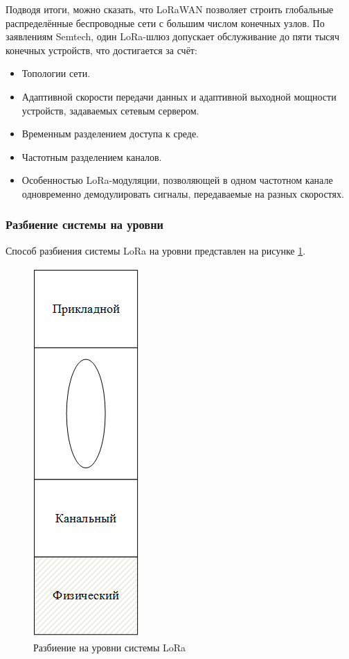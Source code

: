 Подводя итоги, можно сказать, что LoRaWAN позволяет строить глобальные распределённые беспроводные сети с большим числом конечных узлов. По заявлениям Semtech, один LoRa-шлюз допускает обслуживание до пяти тысяч конечных устройств, что достигается за счёт:
\begin{itemize}	
\item Топологии сети.
\item Адаптивной скорости передачи данных и адаптивной выходной мощности устройств, задаваемых сетевым сервером.
\item Временным разделением доступа к среде.
\item Частотным разделением каналов.
\item Особенностью LoRa-модуляции, позволяющей в одном частотном канале одновременно демодулировать сигналы, передаваемые на разных скоростях.
\end{itemize}


\subsubsection{Разбиение системы на уровни}
Способ разбиения системы LoRa на уровни представлен на рисунке
\ref{fig:system_levels_LoRa}.
\begin{figure}[H]
	\centering\includegraphics[width=0.2\linewidth]{img/system_levels_LoRa}
	\caption{Разбиение на уровни системы LoRa}
	\label{fig:system_levels_LoRa}
\end{figure}

